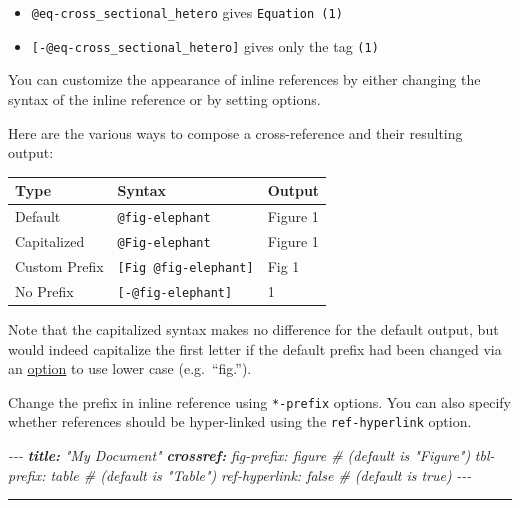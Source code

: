 \documentclass[
  a4paper,
  twoside,
  openright]{book}
\newenvironment{Shaded}{\begin{snugshade}}{\end{snugshade}}
\newcommand{\AnnotationTok}[1]{\textcolor[rgb]{0.56,0.35,0.01}{\textbf{\textit{#1}}}}
\newcommand{\CommentTok}[1]{\textcolor[rgb]{0.56,0.35,0.01}{\textit{#1}}}
\providecommand{\tightlist}{%
  \setlength{\itemsep}{0pt}\setlength{\parskip}{0pt}}
\theoremstyle{definition}
\theoremstyle{definition}
\theoremstyle{definition}
\theoremstyle{definition}
\theoremstyle{remark}
\begin{document}
\begin{itemize}
\tightlist
\item
  \texttt{@eq-cross\_sectional\_hetero} gives \texttt{Equation\ (1)}
\item
  \texttt{{[}-@eq-cross\_sectional\_hetero{]}} gives only the tag \texttt{(1)}
\end{itemize}

You can customize the appearance of inline references by either changing the syntax of the inline reference or by setting options.

Here are the various ways to compose a cross-reference and their resulting output:

\begin{longtable}[]{@{}lll@{}}
\toprule\noalign{}
Type & Syntax & Output \\
\midrule\noalign{}
\endhead
\bottomrule\noalign{}
\endlastfoot
Default & \texttt{@fig-elephant} & Figure 1 \\
Capitalized & \texttt{@Fig-elephant} & Figure 1 \\
Custom Prefix & \texttt{{[}Fig\ @fig-elephant{]}} & Fig 1 \\
No Prefix & \texttt{{[}-@fig-elephant{]}} & 1 \\
\end{longtable}

Note that the capitalized syntax makes no difference for the default output, but would indeed capitalize the first letter if the default prefix had been changed via an \href{https://quarto.org/docs/authoring/cross-reference-options.html\#references}{option} to use lower case (e.g.~``fig.'').

Change the prefix in inline reference using \texttt{*-prefix} options. You can also specify whether references should be hyper-linked using the \texttt{ref-hyperlink} option.

\begin{Shaded}
\begin{Highlighting}[]
\CommentTok{{-}{-}{-}}
\AnnotationTok{title:}\CommentTok{ "My Document"}
\AnnotationTok{crossref:}
\CommentTok{  fig{-}prefix: figure   \# (default is "Figure")}
\CommentTok{  tbl{-}prefix: table    \# (default is "Table")}
\CommentTok{  ref{-}hyperlink: false \# (default is true)}
\CommentTok{{-}{-}{-}}
\end{Highlighting}
\end{Shaded}

\begin{center}\rule{0.5\linewidth}{0.5pt}\end{center}
\end{document}
